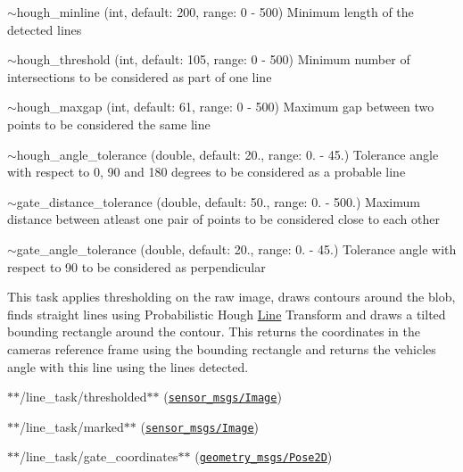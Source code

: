 \begin{DoxyItemize}
\item {\ttfamily $\sim$hough\+\_\+minline} (int, default\+: 200, range\+: 0 -\/ 500) Minimum length of the detected lines
\item {\ttfamily $\sim$hough\+\_\+threshold} (int, default\+: 105, range\+: 0 -\/ 500) Minimum number of intersections to be considered as part of one line
\item {\ttfamily $\sim$hough\+\_\+maxgap} (int, default\+: 61, range\+: 0 -\/ 500) Maximum gap between two points to be considered the same line
\item {\ttfamily $\sim$hough\+\_\+angle\+\_\+tolerance} (double, default\+: 20., range\+: 0. -\/ 45.) Tolerance angle with respect to 0, 90 and 180 degrees to be considered as a probable line
\item {\ttfamily $\sim$gate\+\_\+distance\+\_\+tolerance} (double, default\+: 50., range\+: 0. -\/ 500.) Maximum distance between atleast one pair of points to be considered close to each other
\item {\ttfamily $\sim$gate\+\_\+angle\+\_\+tolerance} (double, default\+: 20., range\+: 0. -\/ 45.) Tolerance angle with respect to 90 to be considered as perpendicular
\end{DoxyItemize}

This task applies thresholding on the raw image, draws contours around the blob, finds straight lines using Probabilistic Hough \hyperlink{classLine}{Line} Transform and draws a tilted bounding rectangle around the contour. This returns the coordinates in the camera\textquotesingle{}s reference frame using the bounding rectangle and returns the vehicle\textquotesingle{}s angle with this line using the lines detected.


\begin{DoxyItemize}
\item $\ast$$\ast${\ttfamily /line\+\_\+task/thresholded}$\ast$$\ast$ (\href{http://docs.ros.org/api/sensor_msgs/html/msg/Image.html}{\tt sensor\+\_\+msgs/\+Image})
\item $\ast$$\ast${\ttfamily /line\+\_\+task/marked}$\ast$$\ast$ (\href{http://docs.ros.org/api/sensor_msgs/html/msg/Image.html}{\tt sensor\+\_\+msgs/\+Image})
\item $\ast$$\ast${\ttfamily /line\+\_\+task/gate\+\_\+coordinates}$\ast$$\ast$ (\href{http://docs.ros.org/api/geometry_msgs/html/msg/Pose2D.html}{\tt geometry\+\_\+msgs/\+Pose2D})
\end{DoxyItemize}


